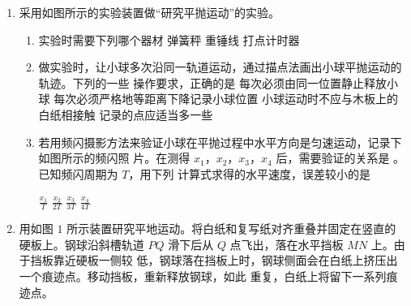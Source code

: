 
\begin{enumerate}
\renewcommand{\labelenumi}{\arabic{enumi}.}
\item
{}
采用如图所示的实验装置做“研究平抛运动”的实验。
\begin{figure}[h!]
\centering

\end{figure}


\begin{enumerate}
\renewcommand{\labelenumi}{\arabic{enumi}.}
\item
实验时需要下列哪个器材  
\threechoices
{弹簧秤}
{重锤线}
{打点计时器}


\item 
做实验时，让小球多次沿同一轨道运动，通过描点法画出小球平抛运动的轨迹。下列的一些
操作要求，正确的是  
\fourchoices
{每次必须由同一位置静止释放小球}
{每次必须严格地等距离下降记录小球位置}
{小球运动时不应与木板上的白纸相接触}
{记录的点应适当多一些}

\item 
若用频闪摄影方法来验证小球在平抛过程中水平方向是匀速运动，记录下如图所示的频闪照
片。在测得 $ x_{1} $，$ x_{2} $，$ x_{3} $，$ x_{4} $ 后，需要验证的关系是  。已知频闪周期为 $ T $，用下列
计算式求得的水平速度，误差较小的是  
\begin{figure}[h!]
\centering

\end{figure}

\fourchoices
{$\frac{x_{1}}{T}$}
{$\frac{x_{2}}{2 T}$}
{$\frac{x_{3}}{3 T}$}
{$\frac{x_{4}}{4 T}$}


\end{enumerate}



\newpage
\item 
{}
用如图 $ 1 $ 所示装置研究平地运动。将白纸和复写纸对齐重叠并固定在竖直的
硬板上。钢球沿斜槽轨道 $ PQ $ 滑下后从 $ Q $ 点飞出，落在水平挡板 $ MN $ 上。由于挡板靠近硬板一侧较
低，钢球落在挡板上时，钢球侧面会在白纸上挤压出一个痕迹点。移动挡板，重新释放钢球，如此
重复，白纸上将留下一系列痕迹点。
\begin{figure}[h!]
\centering

\end{figure}


\end{enumerate}
